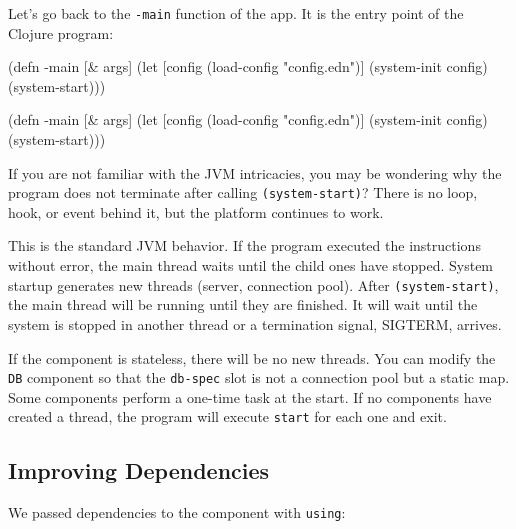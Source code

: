 
Let's go back to the \verb|-main| function of the app. It is the entry point of the Clojure program:

\ifnarrow

\begin{english}
  \begin{clojure}
(defn -main [& args]
  (let [config
        (load-config "config.edn")]
    (system-init config)
    (system-start)))
  \end{clojure}
\end{english}

\else

\begin{english}
  \begin{clojure}
(defn -main [& args]
  (let [config (load-config "config.edn")]
    (system-init config)
    (system-start)))
  \end{clojure}
\end{english}

\fi

If you are not familiar with the JVM intricacies, you may be wondering why the program does not terminate after calling \verb|(system-start)|? There is no loop, hook, or event behind it, but the platform continues to work.


This is the standard JVM behavior. If the program executed the instructions without error, the main thread waits until the child ones have stopped. System startup generates new threads (server, connection pool). After \verb|(system-start)|, the main thread will be running until they are finished. It will wait until the system is stopped in another thread or a termination signal, SIGTERM, arrives.

If the component is stateless, there will be no new threads. You can modify the \verb|DB| component so that the \verb|db-spec| slot is not a connection pool but a static map. Some components perform a one-time task at the start. If no components have created a thread, the program will execute \verb|start| for each one and exit.

\subsection{Improving Dependencies}


We passed dependencies to the component with \verb|using|:

